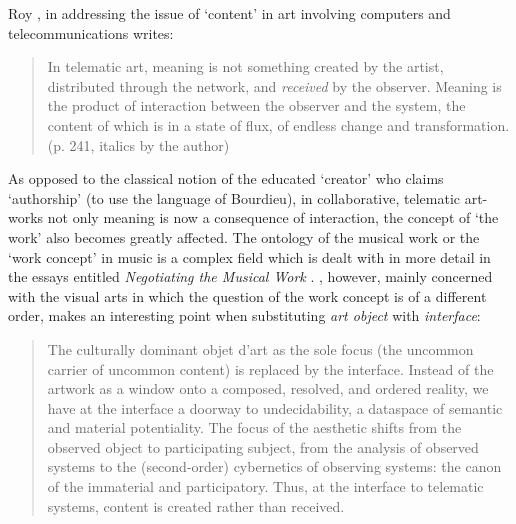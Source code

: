 Roy \citet{Ascott}, in addressing the issue of `content' in art involving computers and telecommunications writes:
\begin{quote}   In telematic art, meaning is not something created by the artist,   distributed through the network, and \emph{received} by the   observer. Meaning is the product of interaction between the observer   and the system, the content of which is in a state of flux, of   endless change and transformation. (p. 241, italics by the author) 
\end{quote}
As opposed to the classical notion of the educated `creator' who claims `authorship' (to use the language of Bourdieu), in collaborative, telematic art-works not only meaning is now a consequence of interaction, the concept of `the work' also becomes greatly affected. The ontology of the musical work or the `work concept' in music is a complex field which is dealt with in more detail in the essays entitled \emph{Negotiating the Musical Work} \citep{frisk-ost06,frisk-ost06-2}. \citeauthor{Ascott}, however, mainly concerned with the visual arts in which the question of the work concept is of a different order, makes an interesting point when substituting \textit{art object} with \textit{interface}:
\begin{quote}
The culturally dominant objet d'art as the sole focus (the uncommon   carrier of uncommon content) is replaced by the interface. Instead   of the artwork as a window onto a composed, resolved, and ordered   reality, we have at the interface a doorway to undecidability, a   dataspace of semantic and material potentiality. The focus of the   aesthetic shifts from the observed object to participating subject,   from the analysis of observed systems to the (second-order)   cybernetics of observing systems: the canon of the immaterial and   participatory. Thus, at the interface to telematic systems, content   is created rather than received.
\citep[p. 242]{Ascott} \end{quote} 

